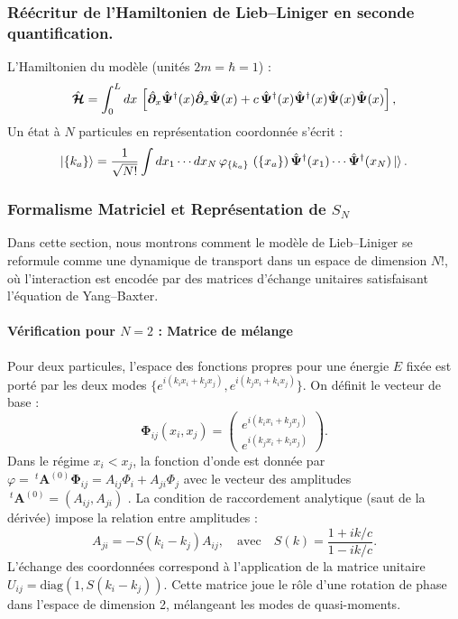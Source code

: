 \subsubsection{Réécritur de l'Hamiltonien de Lieb--Liniger en seconde quantification.}

L’Hamiltonien du modèle (unités $2m=\hbar=1$)  :
\begin{equation}
\hat{\bm{\mathcal H}}
=
\int_0^L dx\,
\left[
\hat{\bm{\partial}} _x\hat{\bm{\Psi}}^\dagger(x)\hat{\bm{\partial}}_x\hat{\bm{\Psi}}(x)
+
c\,\hat{\bm{\Psi}}^\dagger(x)\hat{\bm{\Psi}}^\dagger(x)\hat{\bm{\Psi}}(x)\hat{\bm{\Psi}}(x)
\right],
\end{equation}
Un état à $N$ particules en représentation coordonnée s’écrit :
\begin{equation}
\ket{\{k_a\}} 
=
\frac{1}{\sqrt{N!}}
\int dx_1\cdots dx_N\,
\varphi_{\{k_a\}} (\{x_a\})\,
\operator{\Psi}^\dagger(x_1)\cdots\operator{\Psi}^\dagger(x_N)\ket{\empty}.
\end{equation}



\subsubsection{Formalisme Matriciel et Représentation de $S_N$}

Dans cette section, nous montrons comment le modèle de Lieb--Liniger se reformule comme une dynamique de transport dans un espace de dimension $N!$, où l'interaction est encodée par des matrices d'échange unitaires satisfaisant l'équation de Yang--Baxter.

\paragraph{Vérification pour $N=2$ : Matrice de mélange}

Pour deux particules, l'espace des fonctions propres pour une énergie $E$ fixée est porté par les deux modes $\{ e^{i(k_i x_i + k_j x_j)} , e^{i(k_j x_i + k_i x_j)} \}$. On définit le vecteur de base :
\begin{equation}
\mathbf{\Phi}_{ij}(x_i,x_j) = \begin{pmatrix} e^{i(k_i x_i + k_j x_j)} \\[4pt] e^{i(k_j x_i + k_i x_j)} \end{pmatrix}.
\end{equation}
Dans le régime $x_i < x_j$, la fonction d'onde est donnée par $\varphi = {~}^t\mathbf{A}^{\!(0)} \mathbf{\Phi}_{ij} =  A_{ij} \Phi_{i} + A_{ji} \Phi_{j}$ avec le vecteur des amplitudes ${~}^t\mathbf{A}^{\!(0)} = ( A_{ij} , A_{ji})$ . La condition de raccordement analytique (saut de la dérivée) impose la relation entre amplitudes :
\begin{equation}
A_{ji} = - S(k_i - k_j) A_{ij}, \quad \text{avec} \quad S(k) = \frac{1 + ik/c}{1 - ik/c}.
\end{equation}
L'échange des coordonnées correspond à l'application de la matrice unitaire $U_{ij} = \text{diag}(1, S(k_i-k_j))$. Cette matrice joue le rôle d'une rotation de phase dans l'espace de dimension 2, mélangeant les modes de quasi-moments.

